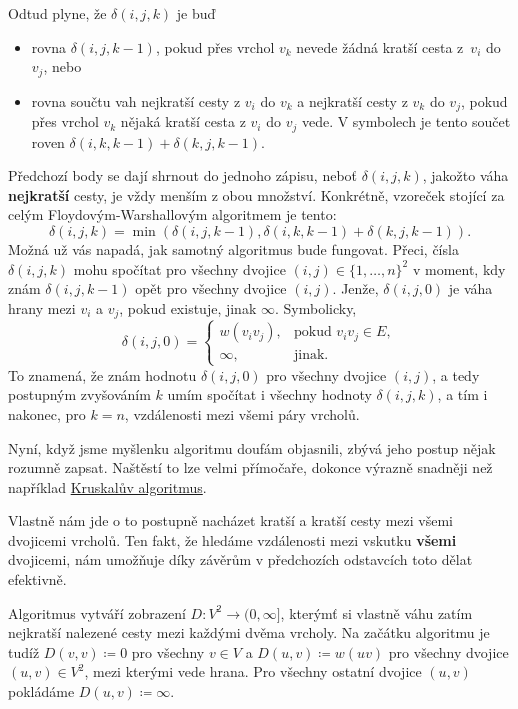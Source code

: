 Odtud plyne, že $\delta(i,j,k)$ je buď
\begin{itemize}
 \item rovna $\delta(i,j,k-1)$, pokud přes vrchol $v_k$ nevede žádná kratší
  cesta z~$v_i$ do $v_j$, nebo
 \item rovna součtu vah nejkratší cesty z $v_i$ do $v_k$ a nejkratší cesty z
  $v_k$ do $v_j$, pokud přes vrchol $v_k$ nějaká kratší cesta z $v_i$ do $v_j$
  vede. V symbolech je tento součet roven $\delta(i,k,k-1) + \delta(k,j,k-1)$.
\end{itemize}
Předchozí body se dají shrnout do jednoho zápisu, neboť $\delta(i,j,k)$, jakožto
váha \textbf{nejkratší} cesty, je vždy menším z obou množství. Konkrétně,
vzoreček stojící za celým Floydovým-Warshallovým algoritmem je tento:
\begin{equation*}
 \label{eq:delta-i-j-k}
 \tag{$\triangle$}
 \delta(i,j,k) = \min(\delta(i,j,k-1), \delta(i,k,k-1) + \delta(k,j,k-1)).
\end{equation*}
Možná už vás napadá, jak samotný algoritmus bude fungovat. Přeci, čísla
$\delta(i,j,k)$ mohu spočítat pro všechny dvojice $(i,j) \in \{1,\ldots,n\}^2$ v
moment, kdy znám $\delta(i,j,k-1)$ opět pro všechny dvojice $(i,j)$. Jenže,
$\delta(i,j,0)$ je váha hrany mezi $v_i$ a $v_j$, pokud existuje, jinak
$\infty$. Symbolicky,
\[
 \delta(i,j,0) =
 \begin{cases}
  w(v_iv_j), &\text{pokud } v_iv_j \in E,\\
  \infty, &\text{jinak}.
 \end{cases}
\]
To znamená, že znám hodnotu $\delta(i,j,0)$ pro všechny dvojice $(i,j)$, a tedy
postupným zvyšováním $k$ umím spočítat i všechny hodnoty $\delta(i,j,k)$, a tím
i nakonec, pro $k = n$, vzdálenosti mezi všemi páry vrcholů.

Nyní, když jsme myšlenku algoritmu doufám objasnili, zbývá jeho postup nějak
rozumně zapsat. Naštěstí to lze velmi přímočaře, dokonce výrazně snadněji než
například \hyperref[alg:kruskal]{Kruskalův algoritmus}.

Vlastně nám jde o to postupně nacházet kratší a kratší cesty mezi všemi
dvojicemi vrcholů. Ten fakt, že hledáme vzdálenosti mezi vskutku \textbf{všemi}
dvojicemi, nám umožňuje díky závěrům v předchozích odstavcích toto dělat
efektivně.

Algoritmus vytváří zobrazení $D: V^2 \to (0,\infty]$, kterýmť si vlastně
 váhu zatím nejkratší nalezené cesty mezi každými dvěma vrcholy.
Na začátku algoritmu je tudíž $D(v,v) \coloneqq 0$ pro všechny $v \in V$ a
$D(u,v) \coloneqq w(uv)$ pro všechny dvojice $(u,v) \in V^2$, mezi kterými vede
hrana. Pro všech\-ny ostatní dvojice $(u,v)$ pokládáme $D(u,v) \coloneqq
\infty$.

